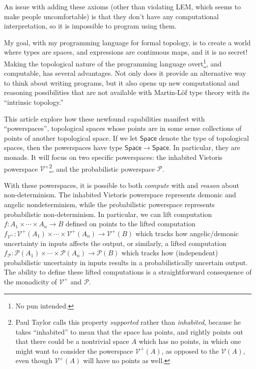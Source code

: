 \documentclass{article}           %
\newcommand{\Space}{\mathsf{Space}}
\newcommand{\Prob}{\mathcal{P}}
\newcommand{\Viet}{{\mathcal{V}^+}}
\begin{document}
An issue with adding these axioms (other than violating LEM, which seems to make people uncomfortable) is that they don't have any computational interpretation, so it is impossible to program using them.

My goal, with my programming language for formal topology, is to create a world where types are spaces, and expressions are continuous maps, and it is no secret! Making the topological nature of the programming language overt\footnote{No pun intended.}, and computable, has several advantages. Not only does it provide an alternative way to think about writing programs, but it also opens up new computational and reasoning possibilities that are not available with Martin-Löf type theory with its ``intrinsic topology.''

This article explore how these newfound capabilities manifest with ``powerspaces'', topological spaces whose points are in some sense collections of points of another topological space. If we let $\Space$ denote the type of topological spaces, then the powerspaces have type $\Space \to \Space$. In particular, they are monads. It will focus on two specific powerspaces: the inhabited Vietoris powerspace $\Viet$\footnote{Paul Taylor calls this property \emph{supported} rather than \emph{inhabited}, because he takes ``inhabited'' to mean that the space has points, and rightly points out that there could be a nontrivial space $A$ which has no points, in which one might want to consider the powerspace $\Viet(A)$, as opposed to the $\mathcal{V}(A)$, even though $\Viet(A)$ will have no points as well.}, and the probabilistic powerspace $\Prob$.

With these powerspaces, it is possible to both \emph{compute} with and \emph{reason} about non-determinism. The inhabited Vietoris powerspace represents demonic and angelic nondeterminism, while the probabilistic powerspace represents probabilistic non-determinism. In particular, we can lift  computation $f : A_1 \times \cdots \times A_n \to B$ defined on points to the lifted computation $f_\Viet : \Viet(A_1) \times \cdots \times \Viet(A_n) \to \Viet(B)$ which tracks how angelic/demonic uncertainty in inputs affects the output, or similarly, a lifted computation $f_\Prob : \Prob(A_1) \times \cdots \times \Prob(A_n) \to \Prob(B)$ which tracks how (independent) probabilistic uncertainty in inputs results in a probabilistically uncertain output. The ability to define these lifted computations is a straightforward consequence of the monadicity of $\Viet$ and $\Prob$.
\end{document}
